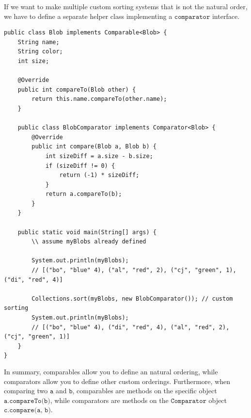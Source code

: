 \documentclass{article}
\theoremstyle{definition}
\theoremstyle{remark}
\theoremstyle{definition}
\begin{document}
If we want to make multiple custom sorting systems that is not the natural order, we have to define a separate helper class implementing a $\texttt{comparator}$ interface. 
\begin{verbatim}
public class Blob implements Comparable<Blob> {
    String name; 
    String color; 
    int size; 
    
    @Override 
    public int compareTo(Blob other) {
        return this.name.compareTo(other.name); 
    }
    
    public class BlobComparator implements Comparator<Blob> {
        @Override 
        public int compare(Blob a, Blob b) {
            int sizeDiff = a.size - b.size; 
            if (sizeDiff != 0) {
                return (-1) * sizeDiff; 
            }
            return a.compareTo(b); 
        }
    }
    
    public static void main(String[] args) {
        \\ assume myBlobs already defined 
        
        System.out.println(myBlobs); 
        // [("bo", "blue" 4), ("al", "red", 2), ("cj", "green", 1), ("di", "red", 4)]
        
        Collections.sort(myBlobs, new BlobComparator()); // custom sorting  
        System.out.println(myBlobs); 
        // [("bo", "blue" 4), ("di", "red", 4), ("al", "red", 2), ("cj", "green", 1)]
    }
}
\end{verbatim}

In summary, comparables allow you to define an natural ordering, while comparators allow you to define other custom orderings. Furthermore, when comparing two $\texttt{a}$ and $\texttt{b}$, comparables are methods on the specific object $\texttt{a.compareTo(b)}$, while comparators are methods on the $\texttt{Comparator}$ object $\texttt{c.compare(a, b)}$. 
\end{document}
